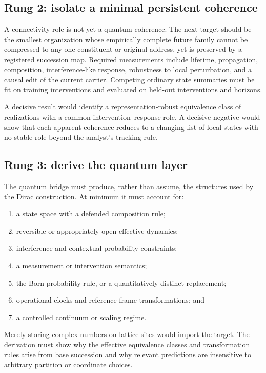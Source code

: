 \subsection{Rung 2: isolate a minimal persistent coherence}

A connectivity role is not yet a quantum coherence. The next target should be
the smallest organization whose empirically complete future family cannot be
compressed to any one constituent or original address, yet is preserved by a
registered succession map. Required measurements include lifetime,
propagation, composition, interference-like response, robustness to local
perturbation, and a causal edit of the current carrier. Competing ordinary
state summaries must be fit on training interventions and evaluated on held-out
interventions and horizons.

A decisive result would identify a representation-robust equivalence class of
realizations with a common intervention--response role. A decisive negative
would show that each apparent coherence reduces to a changing list of local
states with no stable role beyond the analyst's tracking rule.

\subsection{Rung 3: derive the quantum layer}

The quantum bridge must produce, rather than assume, the structures used by the
Dirac construction. At minimum it must account for:
\begin{enumerate}
  \item a state space with a defended composition rule;
  \item reversible or appropriately open effective dynamics;
  \item interference and contextual probability constraints;
  \item a measurement or intervention semantics;
  \item the Born probability rule, or a quantitatively distinct replacement;
  \item operational clocks and reference-frame transformations; and
  \item a controlled continuum or scaling regime.
\end{enumerate}
Merely storing complex numbers on lattice sites would import the target. The
derivation must show why the effective equivalence classes and transformation
rules arise from base succession and why relevant predictions are insensitive
to arbitrary partition or coordinate choices.

